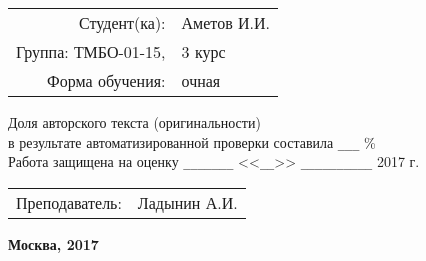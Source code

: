 \begin{titlepage}
	\begin{flushright}
	  \begin{tabular}{rl}
            Студент(ка): & Аметов И.И. \\
	    Группа: ТМБО-01-15, & 3 курс \\
	    Форма обучения: & очная \\
		\end{tabular}
	\end{flushright}

\begin{center}
Доля авторского текста (оригинальности) \\
в результате автоматизированной проверки составила \verb|___| \% \\
Работа защищена на оценку \verb|_______| <<\verb|__|>> \verb|__________| 2017 г.
\end{center}

\vspace{12pt}

	\begin{flushright}
	  \begin{tabular}{rl}
            Преподаватель: & Ладынин А.И. \\
	  \end{tabular}
	\end{flushright}

\vfill

	\begin{center} %
		\bfseries
		Москва, 2017
	\end{center}
	
\end{titlepage} 

